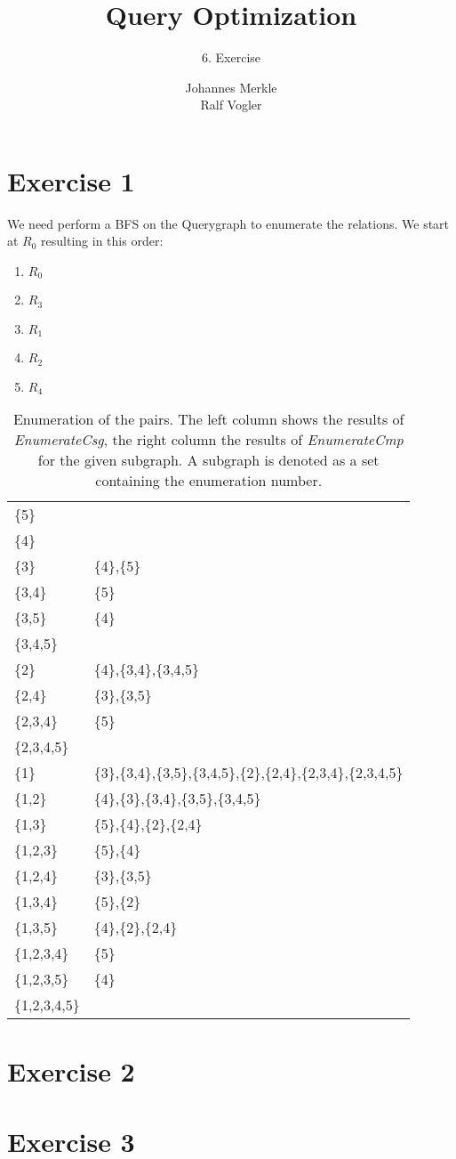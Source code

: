 \documentclass[11pt,a4paper]{scrartcl}
\begin{document}
\author{Johannes Merkle\\Ralf Vogler}
\title{Query Optimization}
\subtitle{6. Exercise}

\maketitle

\section*{Exercise 1}

We need perform a BFS on the Querygraph to enumerate the relations. We start at $R_0$ resulting in this order:\\
\begin{enumerate}
\item $R_0$
\item $R_3$
\item $R_1$
\item $R_2$
\item $R_4$
\end{enumerate}

\begin{table}[H]
\centering
\begin{tabular}{|l|l|}
\hline
\{5\} &  \\
\{4\} &  \\
\{3\} & \{4\},\{5\} \\
\{3,4\} & \{5\} \\
\{3,5\} & \{4\} \\
\{3,4,5\} & \\
\{2\} & \{4\},\{3,4\},\{3,4,5\} \\
\{2,4\} & \{3\},\{3,5\} \\
\{2,3,4\} & \{5\} \\
\{2,3,4,5\} &  \\
\{1\} & \{3\},\{3,4\},\{3,5\},\{3,4,5\},\{2\},\{2,4\},\{2,3,4\},\{2,3,4,5\} \\
\{1,2\} & \{4\},\{3\},\{3,4\},\{3,5\},\{3,4,5\} \\
\{1,3\} & \{5\},\{4\},\{2\},\{2,4\} \\
\{1,2,3\} & \{5\},\{4\} \\
\{1,2,4\} & \{3\},\{3,5\} \\
\{1,3,4\} & \{5\},\{2\} \\
\{1,3,5\} & \{4\},\{2\},\{2,4\} \\
\{1,2,3,4\} & \{5\} \\
\{1,2,3,5\} & \{4\} \\
\{1,2,3,4,5\} &  \\
\hline
\end{tabular}
\caption{Enumeration of the pairs. The left column shows the results of \textit{EnumerateCsg}, the right column the results of \textit{EnumerateCmp} for the given subgraph. A subgraph is denoted as a set containing the enumeration number.}
\label{tab:dp}
\end{table}

\section*{Exercise 2}

\section*{Exercise 3}
\end{document}
